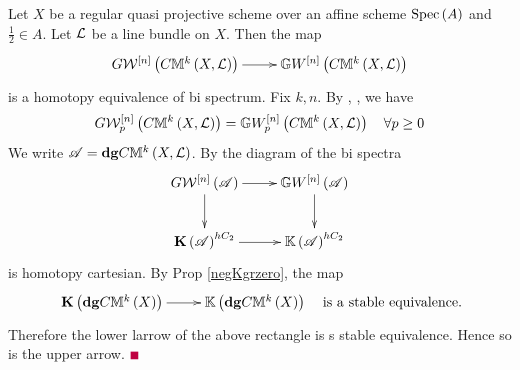 \documentclass[12pt]{article}
\begin{document}
\bC\label{consSpan}{\rm 
Let $X$ be a regular quasi projective scheme over an affine scheme $\mathrm{Spec}\left(A\right)$ and $\frac{1}{2}\in A$. 
Let ${\mathcal{L}}$ be a line bundle on $X$.
Then the map
$$
\diagram 
G{\CW}^{\LRt{n}}\LRf{C{\BM}^k\LRf{X, {\CL}}}  \ar[r] & {\BG}{W}^{\LRt{n}}\LRf{C{\BM}^k\LRf{X, {\CL}}}  \\
\enddiagram
$$
is a homotopy equivalence of bi spectrum.
}
\eC
\pf Fix $k, n$. By \cite[Prop 8.7]{S17}, \cite[pp 466]{M23}, we have 
$$
{G}{\mathcal{W}}_p^{\left[ n\right]}\left( C{\mathbb{M}}^k\left( X, {\mathcal{L}}\right)\right)= {\mathbb{G}}{W}_p^{\left[ n\right]}\left( C{\mathbb{M}}^k\left( X, {\mathcal{L}}\right)\right)\quad \forall p\geq 0
$$ 
We write ${\mathscr {A}}= {\bf dg}C{\mathbb{M}}^k\left( X, {\mathcal{L}}\right)$. By \cite[Prop 8.14, 1803]{S17} the diagram of the bi spectra
$$
\diagram
G{\CW}^{\LRt{n}}\LRf{{\SA}} \ar[r] \ar[d]& {\BG}{W}^{\LRt{n}}\LRf{{\SA}}\ar[d]\\
{\bf K}\LRf{{\SA}}^{hC_2} \ar[r] & {\BK}\LRf{{\SA}}^{hC_2} \\
\enddiagram 
$$
is homotopy cartesian. 
By Prop \ref{negKgrzero}, the map
$$
\diagram
{\bf K}\LRf{{\bf dg}C{\BM}^k\LRf{X}} \ar[r] & {\BK}\LRf{{\bf dg}C{\BM}^k\LRf{X}} \\
\enddiagram 
\quad {\rm is ~a~ stable~ equivalence}.
$$
Therefore the lower larrow of the above rectangle is s stable equivalence. Hence so is the upper arrow.
\pic $\eop$ 


\end{document}
